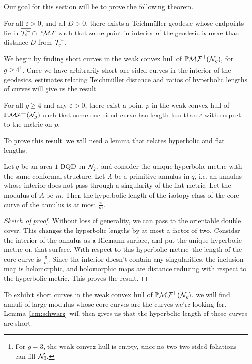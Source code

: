 \documentclass[12pt, reqno]{amsart}
\begin{document}
Our goal for this section will be to prove the following theorem.
\begin{theorem}
  \label{thm:qc-fail}
  For all $\varepsilon > 0$, and all $D > 0$, there exists a Teichm\"uller geodesic whose endpoints lie in $\overline{\mathcal{T}_{\varepsilon}^{-}} \cap \mathbb{P}\mathcal{MF}$ such that some point in interior of the geodesic is more than distance $D$ from $\mathcal{T}_{\varepsilon}^{-}$.
\end{theorem}

We begin by finding short curves in the weak convex hull of $\mathbb{P}\mathcal{MF}^+(\mathcal{N}_g)$, for $g \geq 4$\footnote{For $g = 3$, the weak convex hull is empty, since no two two-sided foliations can fill $\mathcal{N}_3$.}.
Once we have arbitrarily short one-sided curves in the interior of the geodesics, estimates relating Teichmüller distance and ratios of hyperbolic lengths of curves will give us the result.
\begin{proposition}
  \label{prop:very-short-curves}
  For all $g \geq 4$ and any $\varepsilon > 0$, there exist a point $p$ in the weak convex hull of $\mathbb{P}\mathcal{MF}^+(\mathcal{N}_g)$ such that some one-sided curve has length less than $\varepsilon$ with respect to the metric on $p$.
\end{proposition}

To prove this result, we will need a lemma that relates hyperbolic and flat lengths.
\begin{lemma}
  \label{lem:schwarz}
  Let $q$ be an area $1$ DQD on $\mathcal{N}_g$, and consider the unique hyperbolic metric with the same conformal structure.
  Let $A$ be a primitive annulus in $q$, i.e. an annulus whose interior does not pass  through a singularity of the flat metric.
  Let the modulus of $A$ be $m$.
  Then the hyperbolic length of the isotopy class of the core curve of the annulus is at most $\frac{\pi}{m}$.
\end{lemma}
\begin{proof}[Sketch of proof]
  Without loss of generality, we can pass to the orientable double cover.
  This changes the hyperbolic lengths by at most a factor of two.
  Consider the interior of the annulus as a Riemann surface, and put the unique hyperbolic metric on that surface.
  With respect to this hyperbolic metric, the length of the core curve is $\frac{\pi}{m}$. Since the interior doesn't contain any singularities, the inclusion map is holomorphic, and holomorphic maps are distance reducing with respect to the hyperbolic metric.
  This proves the result.
\end{proof}
To exhibit short curves in the weak convex hull of $\mathbb{P}\mathcal{MF}^+(\mathcal{N}_g)$, we will find annuli of large modulus whose core curves are the curves we're looking for.
Lemma \ref{lem:schwarz} will then gives us that the hyperbolic length of those curves are short.
\end{document}
